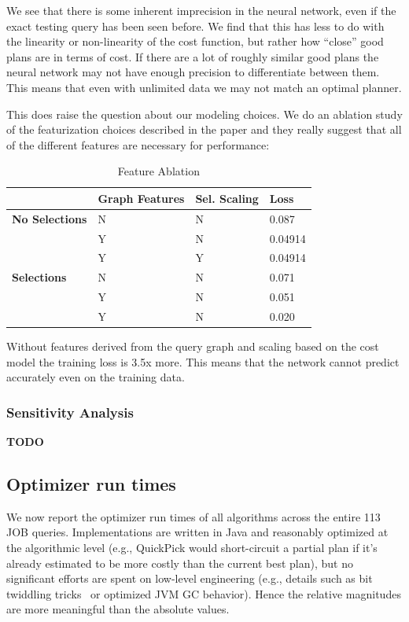 We see that there is some inherent imprecision in the neural network, even if the exact testing query has been seen before. We find that this has less to do with the linearity or non-linearity of the cost function, but rather how ``close'' good plans are in terms of cost. If there are a lot of roughly similar good plans the neural network may not have enough precision to differentiate between them.
This means that even with unlimited data we may not match an optimal planner. 

This does raise the question about our modeling choices. We do an ablation study of the featurization choices described in the paper and they really suggest that all of the different features are necessary for performance:

\begin{table}[ht!]\centering \small
\caption{\small{Feature Ablation}}\vspace{0.25em}
\begin{tabular}{|l|l|l|l|}\hline
    & {\bf Graph Features}  & {\bf Sel. Scaling}  & {\bf Loss} \\ \hline
{\bf No Selections}  & N  & N   & 0.087 \\ \hline
 & Y  & N   & 0.04914 \\ \hline
  & Y  & Y   & 0.04914 \\ \hline
\hline
{\bf Selections}  & N  & N   &  0.071\\ \hline
& Y  & N   &  0.051\\ \hline
& Y  & N   &  0.020\\ \hline
\end{tabular}
\end{table}

Without features derived from the query graph and scaling based on the cost model the training loss is 3.5x more. This means that the network cannot predict accurately even on the training data.

\subsubsection{Sensitivity Analysis}
\textbf{TODO}

\subsection{Optimizer run times}
We now report the optimizer run times of all algorithms across the entire 113 JOB queries.  Implementations are written in Java and reasonably optimized at the algorithmic level (e.g., QuickPick would short-circuit a partial plan if it's already estimated to be more costly than the current best plan), but no significant efforts are spent on low-level engineering (e.g., details such as bit twiddling tricks~\cite{vance1996rapid} or optimized JVM GC behavior).  Hence the relative magnitudes are more meaningful than the absolute values.


